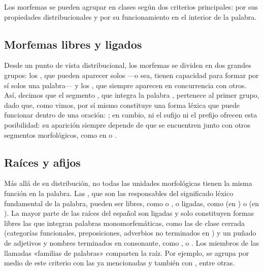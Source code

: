 Los morfemas se pueden agrupar en clases según dos criterios principales: por
sus propiedades distribucionales y por su funcionamiento en el interior de la
palabra.

\subsection{Morfemas libres y ligados}

Desde un punto de vista distribucional, los morfemas se dividen en dos grandes
grupos: los , que pueden aparecer solos ---o sea, tienen
capacidad para formar por sí solos una palabra--- y los , que siempre aparecen en concurrencia con otros. Así, decimos que el
segmento , que integra la palabra , pertenece
al primer grupo, dado que, como vimos, por sí mismo constituye una forma léxica
que puede funcionar dentro de una oración: ; en
cambio, ni el sufijo  ni el prefijo  ofrecen esta
posibilidad: su aparición siempre depende de que se encuentren junto con otros
segmentos morfológicos, como en  o .

\subsection{Raíces y afijos}

Más allá de su distribución, no todas las unidades morfológicas tienen la misma
función en la palabra. Las , que son las responsables del
significado léxico fundamental de la palabra, pueden ser libres, como
 o , o ligadas, como  (en
) o  (en ). La mayor parte de las
raíces del español son ligadas y solo constituyen formas libres las que
integran palabras monomorfemáticas, como las de clase cerrada (categorías
funcionales, preposiciones, adverbios no terminados en ) y un
puñado de adjetivos y nombres terminados en consonante, como ,
 o . Los miembros de las llamadas «familias de
palabras» comparten la raíz. Por ejemplo,  se agrupa por medio
de este criterio con las ya mencionadas  y también con , entre otras.

